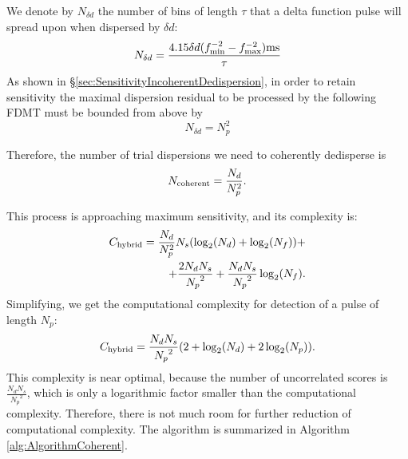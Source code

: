 \documentclass[iop]{emulateapj}
\begin{document}
We denote by $N_{\delta{d}}$ the number of bins of length $\tau$ that a delta function pulse will spread upon when dispersed by $\delta{d}$:
\begin{equation}
N_{\delta d} = \frac{4.15\delta d(f^{-2}_{\min} - f^{-2}_{\max}){\rm ms}}{\tau}
\end{equation}
%
As shown in \S \ref{sec:SensitivityIncoherentDedispersion}, in order to retain sensitivity the maximal dispersion residual to be processed by the following FDMT must be bounded from above by  
\begin{equation}
N_{\delta d} = N_p^2
\end{equation}

Therefore, the number of trial dispersions we need to coherently dedisperse is 
\begin{equation} 
N_{\rm coherent}=\frac{N_d}{N_{p}^2}.
\end{equation}

This process is approaching maximum sensitivity, and its complexity is:
\begin{align}
C_{\rm hybrid} = \frac{{N_{d}}}{N_{p}^2}{N_{s}}(\log_2({N_{d}}) + \log_2({N_{f}})) +\\ \nonumber + \frac{2{N_{d}}{N_{s}}}{{N_{p}}^2} + \frac{{N_{d}}{N_{s}}}{{N_{p}}^2}\log_2({N_{f}}). 
\end{align} 
Simplifying, we get the computational complexity for detection of a pulse of length ${N_{p}}$:
\begin{equation}
C_{\rm hybrid} = \frac{{N_{d}}{N_{s}}}{{N_{p}}^2}(2 + \log_2({N_{d}}) + 2\log_2({N_{p}})). 
\end{equation}
This complexity is near optimal, because the number of uncorrelated scores is $\frac{{N_{d}}{N_{s}}}{{N_{p}}^2}$, which is only a logarithmic factor smaller than the computational complexity. Therefore, there is not much room for further reduction of computational complexity. The algorithm is summarized in Algorithm \ref{alg:AlgorithmCoherent}.
\end{document}
